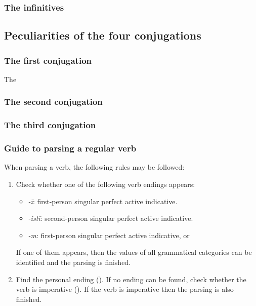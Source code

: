 \documentclass{article}
\newcommand*{\corpus}[1]{\emph{#1}}
\begin{document}
\subsubsection{The infinitives}

\subsection{Peculiarities of the four conjugations}

\subsubsection{The first conjugation}

The 

\subsubsection{The second conjugation}

\subsubsection{The third conjugation}

\subsubsection{Guide to parsing a regular verb}

When parsing a verb, the following rules may be followed:
\begin{enumerate}
    \item Check whether one of the following verb endings appears:
    \begin{itemize}
        \item \corpus{-ī}: first-person singular perfect active indicative.
        \item \corpus{-istī}: second-person singular perfect active indicative.
        \item \corpus{-m}: first-person singular perfect active indicative, 
        or %
    \end{itemize}
    If one of them appears, then the values of all grammatical categories can be identified
    and the parsing is finished.
    \item Find the personal ending ().
    If no ending can be found, 
    check whether the verb is imperative ().
    If the verb is imperative then the parsing is also finished.
\end{enumerate}
\end{document}
